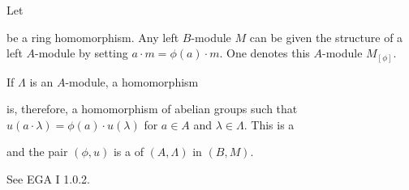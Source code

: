 \documentclass [preview, border = 20pt] {standalone}
\begin{document}
\pagecolor{black}
\color{white}
Let
\begin{center}
\end{center} 
be a ring homomorphism. Any left $B$-module $M$ can be given the structure of a left $A$-module by setting $a\cdot m = \phi (a)\cdot m$. One denotes this $A$-module $M_{[\phi]}$.

If $\Lambda$ is an $A$-module, a homomorphism
\begin{center}
\end{center}
is, therefore, a homomorphism of abelian groups such that $u(a\cdot\lambda) = \phi(a)\cdot u(\lambda)$ for $a\in A$ and $\lambda\in \Lambda$. This is a 
\begin{center}
\end{center} 
and the pair $(\phi, u)$ is a  of $(A,\Lambda)$ in $(B, M)$.

\footnotesize
See EGA I 1.0.2.
\end{document}
